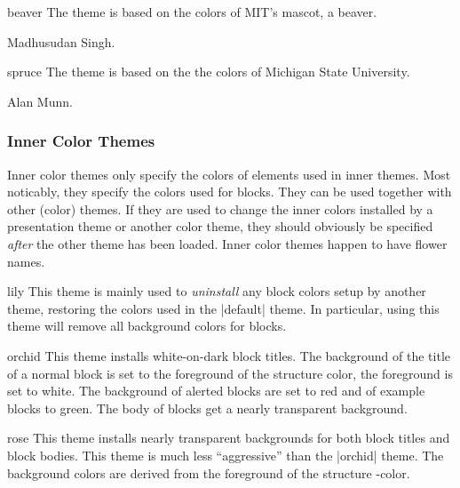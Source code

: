 \begin{colorthemeexample}{beaver}
  The theme is based on the colors of MIT's mascot, a beaver.

  \themeauthor Madhusudan Singh.
\end{colorthemeexample}

\begin{colorthemeexample}{spruce}
  The theme is based on the the colors of Michigan State University.
  
  \themeauthor Alan Munn.
\end{colorthemeexample}

\subsubsection{Inner Color Themes}

Inner color themes only specify the colors of elements used in inner themes. Most noticably, they specify the colors used for blocks. They can be used together with other (color) themes. If they are used to change the inner colors installed by a presentation theme or another color theme, they should obviously be specified \emph{after} the other theme has been loaded. Inner color themes happen to have flower names.

\begin{colorthemeexample}{lily}
  This theme is mainly used to \emph{uninstall} any block colors setup by another theme, restoring the colors used in the |default| theme. In particular, using this theme will remove all background colors for blocks.
\end{colorthemeexample}

\begin{colorthemeexample}{orchid}
  This theme installs white-on-dark block titles. The background of the title of a normal block is set to the foreground of the structure color, the foreground is set to white. The background of alerted blocks are set to red and of example blocks to green. The body of blocks get a nearly transparent background.
\end{colorthemeexample}

\begin{colorthemeexample}{rose}
  This theme installs nearly transparent backgrounds for both block titles and block bodies. This theme is much less ``aggressive'' than the |orchid| theme. The background colors are derived from the foreground of the structure \beamer-color.
\end{colorthemeexample}

